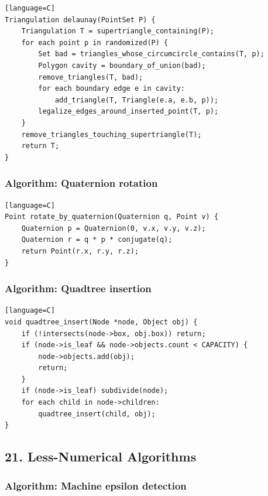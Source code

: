 \documentclass[11pt]{article}
\begin{document}
\begin{verbatim}[language=C]
Triangulation delaunay(PointSet P) {
    Triangulation T = supertriangle_containing(P);
    for each point p in randomized(P) {
        Set bad = triangles_whose_circumcircle_contains(T, p);
        Polygon cavity = boundary_of_union(bad);
        remove_triangles(T, bad);
        for each boundary edge e in cavity:
            add_triangle(T, Triangle(e.a, e.b, p));
        legalize_edges_around_inserted_point(T, p);
    }
    remove_triangles_touching_supertriangle(T);
    return T;
}
\end{verbatim}

\subsubsection{Algorithm: Quaternion rotation}\label{algorithm-quaternion-rotation}

\begin{verbatim}[language=C]
Point rotate_by_quaternion(Quaternion q, Point v) {
    Quaternion p = Quaternion(0, v.x, v.y, v.z);
    Quaternion r = q * p * conjugate(q);
    return Point(r.x, r.y, r.z);
}
\end{verbatim}

\subsubsection{Algorithm: Quadtree insertion}\label{algorithm-quadtree-insertion}

\begin{verbatim}[language=C]
void quadtree_insert(Node *node, Object obj) {
    if (!intersects(node->box, obj.box)) return;
    if (node->is_leaf && node->objects.count < CAPACITY) {
        node->objects.add(obj);
        return;
    }
    if (node->is_leaf) subdivide(node);
    for each child in node->children:
        quadtree_insert(child, obj);
}
\end{verbatim}

\subsection{21. Less-Numerical Algorithms}\label{less-numerical-algorithms}

\subsubsection{Algorithm: Machine epsilon detection}\label{algorithm-machine-epsilon-detection}
\end{document}
